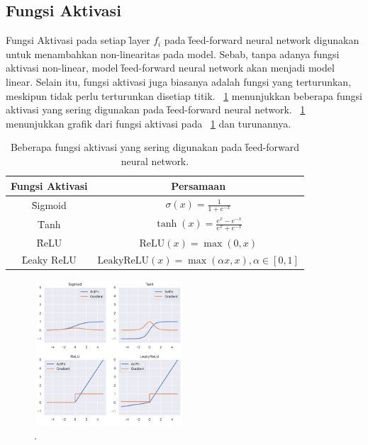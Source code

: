     \subsection{Fungsi Aktivasi}

    Fungsi Aktivasi pada setiap \f{layer} $f_i$ pada \f{feed-forward neural network} digunakan untuk menambahkan non-linearitas pada model. Sebab, tanpa adanya fungsi aktivasi non-linear, model \f{feed-forward neural network} akan menjadi model linear. Selain itu, fungsi aktivasi juga biasanya adalah fungsi yang terturunkan, meskipun tidak perlu terturunkan disetiap titik. \tab~\ref{tab:activation-function} menunjukkan beberapa fungsi aktivasi yang sering digunakan pada \f{feed-forward neural network}. \pic~\ref{fig:activation-function} menunjukkan grafik dari fungsi aktivasi pada \tab~\ref{tab:activation-function} dan turunannya.

    \begin{table}
        \centering
        \caption{Beberapa fungsi aktivasi yang sering digunakan pada \f{feed-forward neural network}.}
        \label{tab:activation-function}
        \begin{tabular}{|c|c|}
            \hline
            \textbf{Fungsi Aktivasi} & \textbf{Persamaan} \\
            \hline
            \hline
            \f{Sigmoid} & $\sigma(x) = \frac{1}{1 + e^{-x}}$ \\
            \hline
            \f{Tanh} & $\tanh(x) = \frac{e^x - e^{-x}}{e^x + e^{-x}}$ \\
            \hline
            \f{ReLU} & $\text{ReLU}(x) = \max(0, x)$ \\
            \hline
            \f{Leaky ReLU} & $\text{LeakyReLU}(x) = \max(\alpha x, x), \alpha \in [0, 1]$ \\
            \hline
        \end{tabular}
    \end{table}
    
    \begin{figure}
        \centering
        \includegraphics[width=0.50\textwidth]{assets/pics/act_function.png}
        \caption{\license.}
        \label{fig:activation-function}
    \end{figure}


